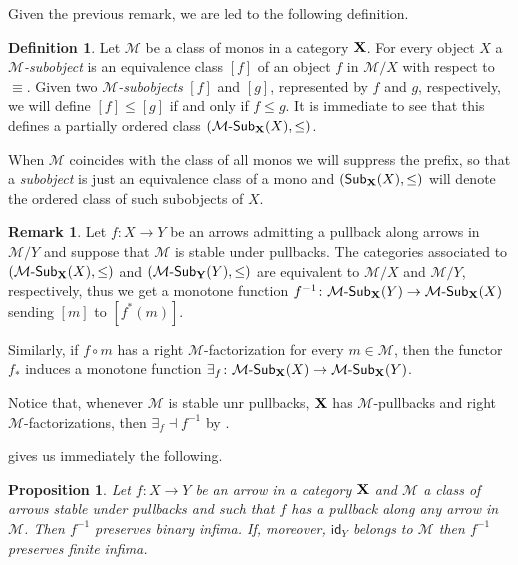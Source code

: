 \documentclass[a4paper]{article}
\newcommand{\sub}[3]{{\mathcal{#1}}\textrm{-}\mathsf{Sub}_{\textbf {\textup{#2}}}(#3)}
\newcommand{\msub}[2]{\mathsf{Sub}_{\textbf {\textup{#1}}}(#2)}
\newcommand{\id}[1]{\mathsf{id}_{#1}}
\def\X{\textbf {\textup{X}}}
\newtheorem{proposition}[theorem]{Proposition}
\theoremstyle{definition}
\newtheorem{definition}[theorem]{Definition}
\newtheorem{remark}[theorem]{Remark}
\begin{document}
Given the previous remark, we are led to the following definition.

\begin{definition} Let $\mathcal{M}$ be a class of monos in a category $\X$. For every object $X$ a \emph{$\mathcal{M}$-subobject} is an equivalence class $[f]$ of an object $f$ in $\mathcal{M}/X$ with respect to $\equiv$. Given two \emph{$\mathcal{M}$-subobjects} $[f]$ and $[g]$, represented by $f$ and $g$, respectively, we will define $[f]\leq [g]$ if and only if $f\leq g$. It is immediate to see that this defines a partially ordered class $(\sub{M}{X}{X}, \leq)$. 
	
	When $\mathcal{M}$ coincides with the class of all monos we will suppress the prefix, so that a \emph{subobject} is just an equivalence class of a mono and $(\msub{X}{X}, \leq)$ will denote the ordered class of such subobjects of $X$.
\end{definition}

\begin{remark}\label{rem:pbo} Let $f\colon X\to Y$ be an arrows admitting a pullback along arrows in $\mathcal{M}/Y$ and suppose that $\mathcal{M}$ is stable under pullbacks. The categories associated to $(\sub{M}{X}{X}, \leq)$ and $(\sub{M}{Y}{Y}, \leq)$ are equivalent to $\mathcal{M}/X$ and $\mathcal{M}/Y$, respectively, thus we get a monotone function $f^{-1}\colon \sub{M}{X}{Y}\to \sub{M}{X}{X}$ sending $[m]$ to $[f^*(m)]$.
	
	Similarly, if $f\circ m$ has a right $\mathcal{M}$-factorization for every $m\in \mathcal{M}$, then the functor $f_*$ induces a monotone function $\exists_f\colon \sub{M}{X}{X}\to \sub{M}{X}{Y}$.
	
	Notice that, whenever $\mathcal{M}$ is stable unr pullbacks, $\X$ has $\mathcal{M}$-pullbacks and  right $\mathcal{M}$-factorizations, then $\exists_f \dashv f^{-1}$ by .
\end{remark}

 gives us immediately the following.

\begin{proposition}\label{prop:finlim}
Let $f\colon X\to Y$ be an arrow in a category $\X$ and $\mathcal{M}$ a class of arrows stable under pullbacks and such that $f$ has a pullback along any arrow in $\mathcal{M}$. Then $f^{-1}$ preserves binary infima. If, moreover, $\id{Y}$ belongs to $\mathcal{M}$ then $f^{-1}$ preserves finite infima.
\end{proposition}
\end{document}
